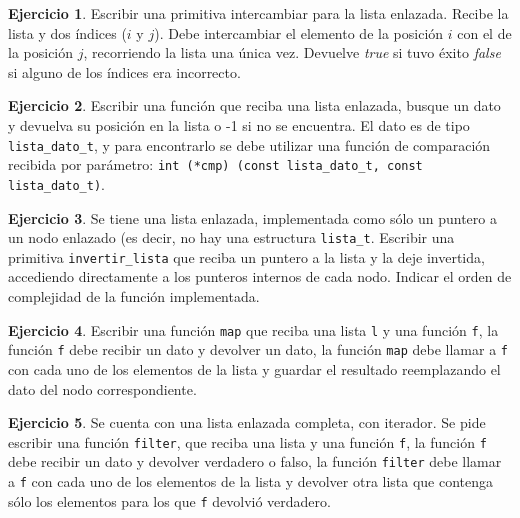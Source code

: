 \documentclass[11pt,a4paper]{article}
\theoremstyle{definition}
\newtheorem{ejercicio}{Ejercicio}[section]
\begin{document}
\begin{ejercicio}
Escribir una primitiva intercambiar para la lista enlazada.  Recibe la
lista y dos índices ($i$ y $j$). Debe intercambiar el elemento de la
posición $i$ con el de la posición $j$, recorriendo la lista una única vez.
Devuelve \textit{true} si tuvo éxito \textit{false} si alguno de los
índices era incorrecto.
\end{ejercicio}

\begin{ejercicio}
Escribir una función que reciba una lista enlazada, busque un dato y devuelva
su posición en la lista o -1 si no se encuentra.  El dato es de tipo
\lstinline!lista_dato_t!, y para encontrarlo se debe utilizar una función de
comparación recibida por parámetro:
\lstinline!int (*cmp) (const lista_dato_t, const lista_dato_t)!.
\end{ejercicio}

\begin{ejercicio}
Se tiene una lista enlazada, implementada como sólo un puntero a un nodo
enlazado (es decir, no hay una estructura \lstinline!lista_t!.
Escribir una primitiva \lstinline!invertir_lista! que reciba un puntero a la lista y
la deje invertida, accediendo directamente a los punteros internos de cada
nodo. Indicar el orden de complejidad de la función implementada.
\end{ejercicio}

\begin{ejercicio}
Escribir una función \lstinline!map! que reciba una lista \lstinline!l! y una
función \lstinline!f!, la función \lstinline!f! debe recibir un dato y devolver
un dato, la función \lstinline!map! debe llamar a \lstinline!f!  con cada uno
de los elementos de la lista y guardar el resultado reemplazando el dato del
nodo correspondiente.
\end{ejercicio}

\begin{ejercicio}
Se cuenta con una lista enlazada completa, con iterador. Se pide escribir
una función \lstinline!filter!, que reciba una lista y una función
\lstinline!f!, la función \lstinline!f! debe recibir un dato y devolver
verdadero o falso, la función \lstinline!filter! debe llamar a
\lstinline!f!  con cada uno de los elementos de la lista y devolver otra
lista que contenga sólo los elementos para los que \lstinline!f! devolvió
verdadero.
\end{ejercicio}
\end{document}
